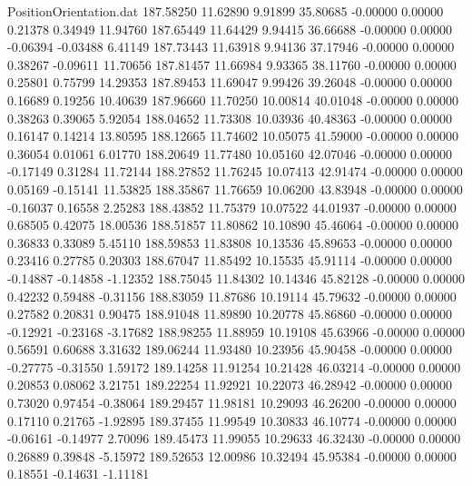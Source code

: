 \begin{filecontents}{PositionOrientation.dat}
 187.58250   11.62890    9.91899    35.80685   -0.00000    0.00000    0.21378    0.34949   11.94760
 187.65449   11.64429    9.94415    36.66688   -0.00000    0.00000   -0.06394   -0.03488    6.41149
 187.73443   11.63918    9.94136    37.17946   -0.00000    0.00000    0.38267   -0.09611   11.70656
 187.81457   11.66984    9.93365    38.11760   -0.00000    0.00000    0.25801    0.75799   14.29353
 187.89453   11.69047    9.99426    39.26048   -0.00000    0.00000    0.16689    0.19256   10.40639
 187.96660   11.70250   10.00814    40.01048   -0.00000    0.00000    0.38263    0.39065    5.92054
 188.04652   11.73308   10.03936    40.48363   -0.00000    0.00000    0.16147    0.14214   13.80595
 188.12665   11.74602   10.05075    41.59000   -0.00000    0.00000    0.36054    0.01061    6.01770
 188.20649   11.77480   10.05160    42.07046   -0.00000    0.00000   -0.17149    0.31284   11.72144
 188.27852   11.76245   10.07413    42.91474   -0.00000    0.00000    0.05169   -0.15141   11.53825
 188.35867   11.76659   10.06200    43.83948   -0.00000    0.00000   -0.16037    0.16558    2.25283
 188.43852   11.75379   10.07522    44.01937   -0.00000    0.00000    0.68505    0.42075   18.00536
 188.51857   11.80862   10.10890    45.46064   -0.00000    0.00000    0.36833    0.33089    5.45110
 188.59853   11.83808   10.13536    45.89653   -0.00000    0.00000    0.23416    0.27785    0.20303
 188.67047   11.85492   10.15535    45.91114   -0.00000    0.00000   -0.14887   -0.14858   -1.12352
 188.75045   11.84302   10.14346    45.82128   -0.00000    0.00000    0.42232    0.59488   -0.31156
 188.83059   11.87686   10.19114    45.79632   -0.00000    0.00000    0.27582    0.20831    0.90475
 188.91048   11.89890   10.20778    45.86860   -0.00000    0.00000   -0.12921   -0.23168   -3.17682
 188.98255   11.88959   10.19108    45.63966   -0.00000    0.00000    0.56591    0.60688    3.31632
 189.06244   11.93480   10.23956    45.90458   -0.00000    0.00000   -0.27775   -0.31550    1.59172
 189.14258   11.91254   10.21428    46.03214   -0.00000    0.00000    0.20853    0.08062    3.21751
 189.22254   11.92921   10.22073    46.28942   -0.00000    0.00000    0.73020    0.97454   -0.38064
 189.29457   11.98181   10.29093    46.26200   -0.00000    0.00000    0.17110    0.21765   -1.92895
 189.37455   11.99549   10.30833    46.10774   -0.00000    0.00000   -0.06161   -0.14977    2.70096
 189.45473   11.99055   10.29633    46.32430   -0.00000    0.00000    0.26889    0.39848   -5.15972
 189.52653   12.00986   10.32494    45.95384   -0.00000    0.00000    0.18551   -0.14631   -1.11181

\end{filecontents}
